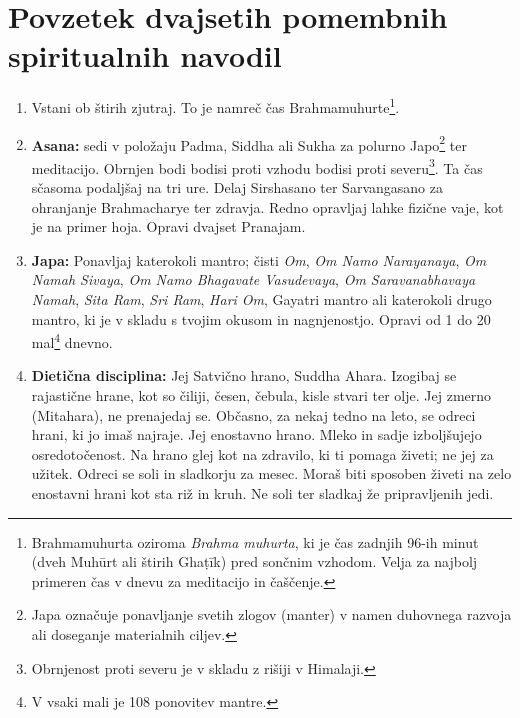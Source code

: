 \section*{Povzetek dvajsetih pomembnih spiritualnih navodil}
\label{sec:povzetek_dvajsetih_pomembnih_spiritualnih_navodil}

\begin{enumerate}
    \item Vstani ob štirih zjutraj. To je namreč čas Brahmamuhurte\footnote{Brahmamuhurta oziroma \emph{Brahma muhurta}, ki je čas zadnjih 96-ih minut (dveh Muh\={u}rt ali štirih Gha\d{t}\={i}k) pred sončnim vzhodom. Velja za najbolj primeren čas v dnevu za meditacijo in čaščenje.}.
    
    \item \textbf{Asana:} sedi v položaju Padma, Siddha ali Sukha za polurno Japo\footnote{Japa označuje ponavljanje svetih zlogov (manter) v namen duhovnega razvoja ali doseganje materialnih ciljev.} ter meditacijo. Obrnjen bodi bodisi proti vzhodu bodisi proti severu\footnote{Obrnjenost proti severu je v skladu z rišiji v Himalaji.}. Ta čas sčasoma podaljšaj na tri ure. Delaj Sirshasano ter Sarvangasano za ohranjanje Brahmacharye ter zdravja. Redno opravljaj lahke fizične vaje, kot je na primer hoja. Opravi dvajset Pranajam.
    
    \item \textbf{Japa:} Ponavljaj katerokoli mantro; čisti \emph{Om}, \emph{Om Namo Narayanaya}, \emph{Om Namah Sivaya}, \emph{Om Namo Bhagavate Vasudevaya}, \emph{Om Saravanabhavaya Namah}, \emph{Sita Ram}, \emph{Sri Ram}, \emph{Hari Om}, Gayatri mantro ali katerokoli drugo mantro, ki je v skladu s tvojim okusom in nagnjenostjo. Opravi od 1 do 20 mal\footnote{V vsaki mali je 108 ponovitev mantre.} dnevno.
    
    \item \textbf{Dietična disciplina:} Jej Satvično hrano, Suddha Ahara. Izogibaj se rajastične hrane, kot so čiliji, česen, čebula, kisle stvari ter olje. Jej zmerno (Mitahara), ne prenajedaj se. Občasno, za nekaj tedno na leto, se odreci hrani, ki jo imaš najraje. Jej enostavno hrano. Mleko in sadje izboljšujejo osredotočenost. Na hrano glej kot na zdravilo, ki ti pomaga živeti; ne jej za užitek. Odreci se soli in sladkorju za mesec. Moraš biti sposoben živeti na zelo enostavni hrani kot sta riž in kruh. Ne soli ter sladkaj že pripravljenih jedi.
    

\end{enumerate}

